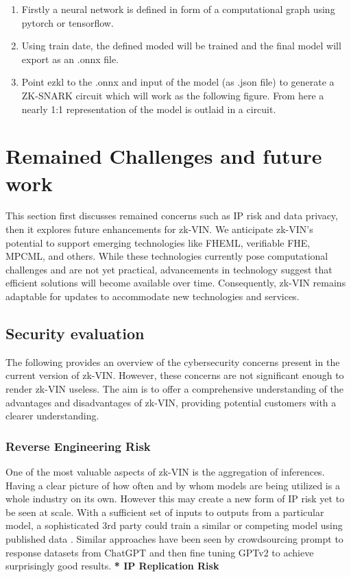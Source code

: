 \documentclass[conference]{IEEEtran}
\begin{document}
\begin{enumerate}
    \item 	Firstly a neural network is defined in form of a computational graph using pytorch or tensorflow.
\item	Using train date, the defined moded will be trained and the final model will export as an .onnx file.
\item	Point ezkl to the .onnx and input of the model (as .json file) to generate a ZK-SNARK circuit which will work as the following figure. From here a nearly 1:1 representation of the model is outlaid in a circuit.

\end{enumerate}



\section{Remained Challenges and future work}

This section first discusses remained concerns such as IP risk and data privacy, then it explores future enhancements for zk-VIN. We anticipate zk-VIN's potential to support emerging technologies like FHEML, verifiable FHE, MPCML, and others. While these technologies currently pose computational challenges and are not yet practical, advancements in technology suggest that efficient solutions will become available over time. Consequently, zk-VIN remains adaptable for updates to accommodate new technologies and services.

\subsection{Security evaluation}

The following provides an overview of the cybersecurity concerns present in the current version of zk-VIN. However, these concerns are not significant enough to render zk-VIN useless. The aim is to offer a comprehensive understanding of the advantages and disadvantages of zk-VIN, providing potential customers with a clearer understanding.

\subsubsection{Reverse Engineering Risk}

One of the most valuable aspects of zk-VIN is the aggregation of inferences. Having a clear picture of how often and by whom models are being utilized is a whole industry on its own. However this may create a new form of IP risk yet to be seen at scale. With a sufficient set of inputs to outputs from a particular model, a sophisticated 3rd party could train a similar or competing model using published data . Similar approaches have been seen by crowdsourcing prompt to response datasets from ChatGPT and then fine tuning GPTv2 to achieve surprisingly good results. 
\textbf{* IP Replication Risk}
\end{document}
